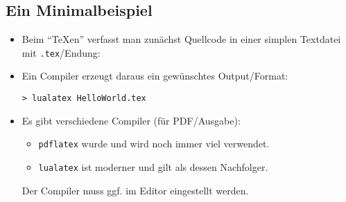 \subsection{Ein Minimalbeispiel}

\begin{frame}[fragile]{\subsecname}
    \begin{itemize}
        \item Beim \enquote{\TeX{}en} verfasst man zunächst \alert{Quellcode} in einer simplen
            Textdatei mit \texttt{.tex}\-/Endung:
        \item Ein \alert{Compiler} erzeugt daraus ein gewünschtes Output\-/Format:
            \begin{center}
                \texttt{> lualatex HelloWorld.tex}
            \end{center}
        \item Es gibt verschiedene Compiler (für PDF\-/Ausgabe):
            \begin{itemize}
                \item \texttt{pdflatex} wurde und wird noch immer viel verwendet.
                \item \texttt{lualatex} ist moderner und gilt als dessen Nachfolger.
            \end{itemize}
            Der Compiler muss ggf. im Editor eingestellt werden.
    \end{itemize}
\end{frame}
